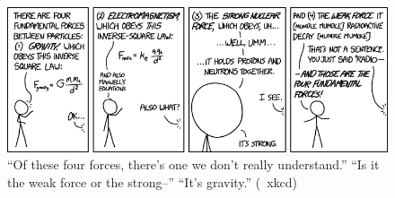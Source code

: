 \documentclass[12pt]{exam}
\begin{document}
\clearpage
\begin{center}
\begin{figure}
\includegraphics[width=\textwidth]{../images/xkcd_fundamental_forces.png}
\caption{``Of these four forces, there's one we don't really understand.'' ``Is it the weak force or the strong--'' ``It's gravity.'' (\textcopyright ~xkcd)}
\end{figure}
\end{center}
\end{document}

